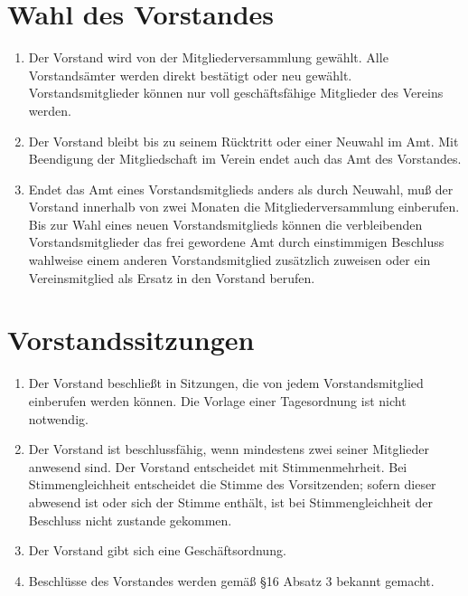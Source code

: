 \documentclass[ngerman]{scrartcl}
\begin{document}
\section{Wahl des Vorstandes} \label{sec:wahl_des_vorstandes}
\begin{enumerate}
 \item Der Vorstand wird von der Mitgliederversammlung gewählt.
 Alle Vorstandsämter werden direkt bestätigt oder neu gewählt.
 Vorstandsmitglieder können nur voll geschäftsfähige
 Mitglieder des Vereins werden.
 \item Der Vorstand bleibt bis zu seinem Rücktritt oder einer
 Neuwahl im Amt. Mit Beendigung der Mitgliedschaft im Verein
 endet auch das Amt des Vorstandes.
 \item Endet das Amt eines Vorstandsmitglieds anders als durch
 Neuwahl, muß der Vorstand innerhalb von zwei Monaten die
 Mitgliederversammlung einberufen. Bis zur Wahl eines neuen
 Vorstandsmitglieds können die verbleibenden
 Vorstandsmitglieder das frei gewordene Amt durch einstimmigen
 Beschluss wahlweise einem anderen Vorstandsmitglied
 zusätzlich zuweisen oder ein Vereinsmitglied als Ersatz in
 den Vorstand berufen.
\end{enumerate}
\section{Vorstandssitzungen} \label{sec:vorstandssitzungen}
\begin{enumerate}
 \item Der Vorstand beschließt in Sitzungen, die von jedem
 Vorstandsmitglied einberufen werden können. Die Vorlage einer
 Tagesordnung ist nicht notwendig.
 \item Der Vorstand ist beschlussfähig, wenn mindestens zwei
 seiner Mitglieder anwesend sind. Der Vorstand entscheidet mit
 Stimmenmehrheit. Bei Stimmengleichheit entscheidet die Stimme
 des Vorsitzenden; sofern dieser abwesend ist oder sich der
 Stimme enthält, ist bei Stimmengleichheit der Beschluss nicht
 zustande gekommen.
 \item Der Vorstand gibt sich eine Geschäftsordnung.
 \item Beschlüsse des Vorstandes werden gemäß §16 Absatz 3
 bekannt gemacht.
\end{enumerate}
\end{document}
